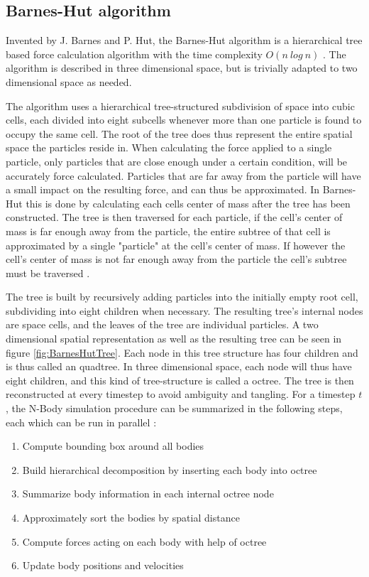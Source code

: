 \subsection{Barnes-Hut algorithm} \label{subsec:BarnesHut}
Invented by J. Barnes and P. Hut, the Barnes-Hut algorithm is a hierarchical tree based force calculation algorithm with the time complexity $O(n \ log \ n)$ \cite{barnes1986hierarchical}. The algorithm is described in three dimensional space, but is trivially adapted to two dimensional space as needed. 

The algorithm uses a hierarchical tree-structured subdivision of space into cubic cells, each divided into eight subcells whenever more than one particle is found to occupy the same cell. The root of the tree does thus represent the entire spatial space the particles reside in. When calculating the force applied to a single particle, only particles that are close enough under a certain condition, will be accurately force calculated. Particles that are far away from the particle will have a small impact on the resulting force, and can thus be approximated. In Barnes-Hut this is done by calculating each cells center of mass after the tree has been constructed. The tree is then traversed for each particle, if the cell's center of mass is far enough away from the particle, the entire subtree of that cell is approximated by a single "particle" at the cell's center of mass. If however the cell's center of mass is not far enough away from the particle the cell's subtree must be traversed \cite{singh1995load}. 

The tree is built by recursively adding particles into the initially empty root cell, subdividing into eight children when necessary. The resulting tree's internal nodes are space cells, and the leaves of the tree are individual particles. A two dimensional spatial representation as well as the resulting tree can be seen in figure \ref{fig:BarnesHutTree}. Each node in this tree structure has four children and is thus called an quadtree. In three dimensional space, each node will thus have eight children, and this kind of tree-structure is called a octree.
The tree is then reconstructed at every timestep to avoid ambiguity and tangling. For a timestep $t$, the N-Body simulation procedure can be summarized in the following steps, each which can be run in parallel \cite{burtscher2011efficient}:

\begin{enumerate}
    \item Compute bounding box around all bodies
    \item Build hierarchical decomposition by inserting each body into octree
    \item Summarize body information in each internal octree node
    \item Approximately sort the bodies by spatial distance
    \item Compute forces acting on each body with help of octree
    \item Update body positions and velocities
\end{enumerate}


